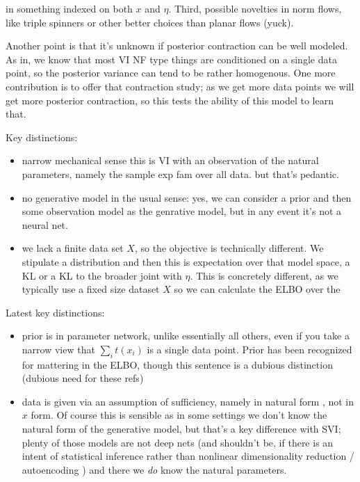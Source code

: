 \documentclass{article}
\begin{document}
in something indexed on both $x$ and $\eta$.  Third, possible novelties in norm flows, like triple spinners or other better choices than planar flows (yuck).

  Another point is that it's unknown if posterior contraction can be well modeled.  As in, we know that most VI NF type things are conditioned on a single data point, so the posterior variance can tend to be rather homogenous.  One more contribution is to offer that contraction study; as we get more data points we will get more posterior contraction, so this tests the ability of this model to learn that.
  
  Key distinctions:
  \begin{itemize}
  \item narrow mechanical sense this is VI with an observation of the natural parameters, namely the sample exp fam over all data.  but that's pedantic.
  \item no generative model in the usual sense: yes, we can consider a prior and then some observation model as the genrative model, but in any event it's not a neural net.
  \item we lack a finite data set $X$, so the objective is technically different.  We stipulate a distribution and then this is expectation over that model space, a KL or a KL to the broader joint with $\eta$.  This is concretely different, as we typically use a fixed size dataset $X$ so we can calculate the ELBO over the 
  \end{itemize}
  
Latest key distinctions:
\begin{itemize}
\item prior is in parameter network, unlike essentially all others, even if you take a narrow view that $\sum_i t(x_i)$ is a single data point.  Prior has been recognized for mattering in the ELBO, though this sentence is a dubious distinction \cite{hoffman2016elbo,cremer2018inference} (dubious need for these refs)
\item data is given via an assumption of sufficiency, namely in natural form \cite{robert2007bayesian}, not in $x$ form.  Of course this is sensible as in some settings we don't know the natural form of the generative model, but that's a key difference with SVI; plenty of those models are not deep nets (and shouldn't be, if there is an intent of statistical inference rather than nonlinear dimensionality reduction / autoencoding ) and there we \emph{do} know the natural parameters.
\end{itemize}
\end{document}
